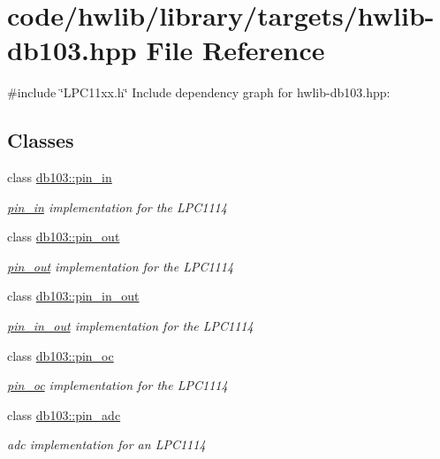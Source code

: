 \hypertarget{hwlib-db103_8hpp}{}\section{code/hwlib/library/targets/hwlib-\/db103.hpp File Reference}
\label{hwlib-db103_8hpp}
{\ttfamily \#include \char`\"{}L\+P\+C11xx.\+h\char`\"{}}\newline
Include dependency graph for hwlib-\/db103.hpp\+:
\subsection*{Classes}
\begin{DoxyCompactItemize}
\item 
class \hyperlink{classdb103_1_1pin__in}{db103\+::pin\+\_\+in}
\begin{DoxyCompactList}\small\item\em \hyperlink{classdb103_1_1pin__in}{pin\+\_\+in} implementation for the L\+P\+C1114 \end{DoxyCompactList}\item 
class \hyperlink{classdb103_1_1pin__out}{db103\+::pin\+\_\+out}
\begin{DoxyCompactList}\small\item\em \hyperlink{classdb103_1_1pin__out}{pin\+\_\+out} implementation for the L\+P\+C1114 \end{DoxyCompactList}\item 
class \hyperlink{classdb103_1_1pin__in__out}{db103\+::pin\+\_\+in\+\_\+out}
\begin{DoxyCompactList}\small\item\em \hyperlink{classdb103_1_1pin__in__out}{pin\+\_\+in\+\_\+out} implementation for the L\+P\+C1114 \end{DoxyCompactList}\item 
class \hyperlink{classdb103_1_1pin__oc}{db103\+::pin\+\_\+oc}
\begin{DoxyCompactList}\small\item\em \hyperlink{classdb103_1_1pin__oc}{pin\+\_\+oc} implementation for the L\+P\+C1114 \end{DoxyCompactList}\item 
class \hyperlink{classdb103_1_1pin__adc}{db103\+::pin\+\_\+adc}
\begin{DoxyCompactList}\small\item\em adc implementation for an L\+P\+C1114 \end{DoxyCompactList}\end{DoxyCompactItemize}
